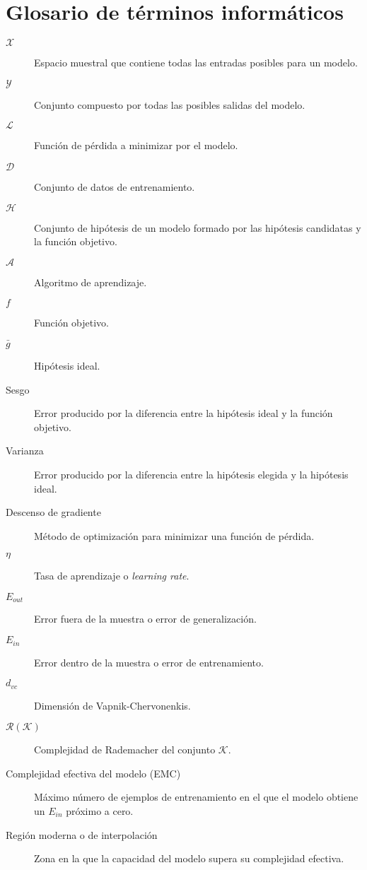 
\chapter*{Glosario de términos informáticos}

\begin{description} 
  \item[$\mathcal{X}$] Espacio muestral que contiene todas las entradas posibles para un modelo.
  \item[$\mathcal{Y}$] Conjunto compuesto por todas las posibles salidas del modelo.
  \item[$\mathcal{L}$] Función de pérdida a minimizar por el modelo.
  \item[$\mathcal{D}$] Conjunto de datos de entrenamiento.
  \item[$\mathcal{H}$] Conjunto de hipótesis de un modelo formado por las hipótesis candidatas y la función objetivo.
  \item[$\mathcal{A}$] Algoritmo de aprendizaje. 
  \item[$f$] Función objetivo. 
  \item[$\bar{g}$] Hipótesis ideal.
  \item[Sesgo] Error producido por la diferencia entre la hipótesis ideal y la función objetivo.
  \item[Varianza] Error producido por la diferencia entre la hipótesis elegida y la hipótesis ideal.
  \item[Descenso de gradiente] Método de optimización para minimizar una función de pérdida.
  \item[$\eta$] Tasa de aprendizaje o \textit{learning rate}.
  \item[$E_{out}$] Error fuera de la muestra o error de generalización. 
  \item[$E_{in}$] Error dentro de la muestra o error de entrenamiento.
  \item[$d_{vc}$] Dimensión de Vapnik-Chervonenkis.
  \item[$\mathcal{R}(\mathcal{K})$] Complejidad de Rademacher del conjunto $\mathcal{K}$.
  \item[Complejidad efectiva del modelo (EMC)] Máximo número de ejemplos de entrenamiento en el que el modelo obtiene un $E_{in}$ próximo a cero.
  \item[Región moderna o de interpolación] Zona en la que la capacidad del modelo supera su complejidad efectiva.

\end{description}
